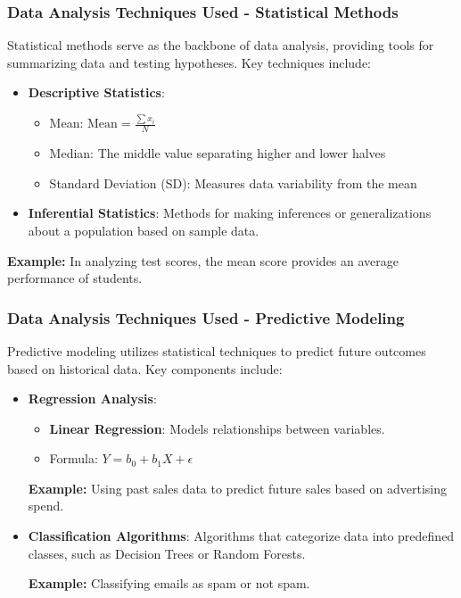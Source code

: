 \documentclass[aspectratio=169]{beamer}
\begin{document}
\begin{frame}[fragile]
    \frametitle{Data Analysis Techniques Used - Statistical Methods}
    Statistical methods serve as the backbone of data analysis, providing tools for summarizing data and testing hypotheses. Key techniques include:
    
    \begin{itemize}
        \item \textbf{Descriptive Statistics}:
        \begin{itemize}
            \item Mean: \( \text{Mean} = \frac{\sum x_i}{N} \)
            \item Median: The middle value separating higher and lower halves
            \item Standard Deviation (SD): Measures data variability from the mean
        \end{itemize}
        
        \item \textbf{Inferential Statistics}:
        Methods for making inferences or generalizations about a population based on sample data.
    \end{itemize}
    
    \textbf{Example:} In analyzing test scores, the mean score provides an average performance of students.
\end{frame}

\begin{frame}[fragile]
    \frametitle{Data Analysis Techniques Used - Predictive Modeling}
    Predictive modeling utilizes statistical techniques to predict future outcomes based on historical data. Key components include:
    
    \begin{itemize}
        \item \textbf{Regression Analysis}:
        \begin{itemize}
            \item \textbf{Linear Regression}: Models relationships between variables.
            \item Formula: \( Y = b_0 + b_1X + \epsilon \)
        \end{itemize}
        
        \textbf{Example:} Using past sales data to predict future sales based on advertising spend.
        
        \item \textbf{Classification Algorithms}:
        Algorithms that categorize data into predefined classes, such as Decision Trees or Random Forests.
        
        \textbf{Example:} Classifying emails as spam or not spam.
    \end{itemize}
\end{frame}
\end{document}
